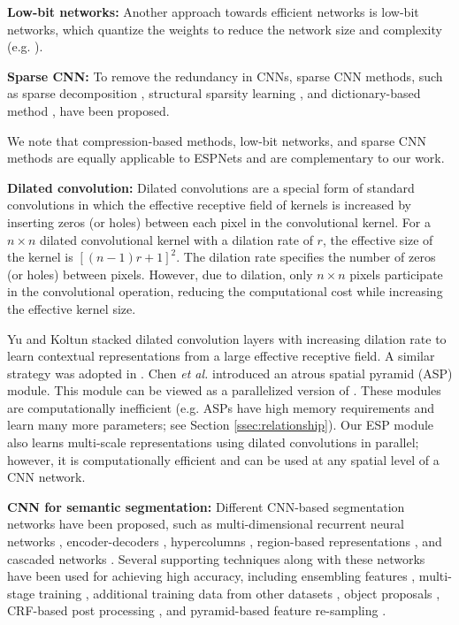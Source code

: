 \documentclass[runningheads]{llncs}
\def\etal{\emph{et al. }}
\begin{document}
\noindent \textbf{Low-bit networks:} Another approach towards efficient networks is low-bit networks, which quantize the weights to reduce the network size and complexity (e.g. \cite{rastegari2016xnor,Hwang2014fixed,courbariaux2016binarized,hubara2016quantized}). 

\noindent \textbf{Sparse CNN:} To remove the redundancy in CNNs, sparse CNN methods, such as sparse decomposition \cite{liu2015sparse}, structural sparsity learning \cite{wen2016learning}, and dictionary-based method \cite{bagherinezhad2017lcnn}, have been proposed. 

We note that compression-based methods, low-bit networks, and sparse CNN methods are equally applicable to ESPNets and are complementary to our work.

\noindent \textbf{Dilated convolution:} Dilated convolutions \cite{holschneider1990real} are a special form of standard convolutions in which the effective receptive field of kernels is increased by inserting zeros (or holes) between each pixel in the convolutional kernel. For a $n \times n$ dilated convolutional kernel with a dilation rate of $r$, the effective size of the kernel is $\left[ (n-1) r + 1\right]^2$. The dilation rate specifies the number of zeros (or holes) between  pixels. However, due to dilation, only $n \times n$ pixels participate in the convolutional operation, reducing the computational cost while increasing the effective kernel size.

Yu and Koltun \cite{yu2015multi} stacked dilated convolution layers with increasing dilation rate to learn contextual representations from a large effective receptive field. A similar strategy was adopted in \cite{yu2017dilated,mehta2017learning,wang2017understanding}. Chen \etal \cite{chen2016deeplab} introduced an atrous spatial pyramid (ASP) module. This module can be viewed as a parallelized version of \cite{chen2016deeplab}. These modules are computationally inefficient (e.g. ASPs have high memory requirements and learn many more parameters; see Section \ref{ssec:relationship}). Our ESP module also learns multi-scale representations using dilated convolutions in parallel; however, it is computationally efficient and can be used at any spatial level of a CNN network. 

\noindent \textbf{CNN for semantic segmentation:} Different CNN-based segmentation networks have been proposed, such as multi-dimensional recurrent neural networks \cite{mrnn:eke}, encoder-decoders \cite{paszke2016enet,romera2018erfnet,badrinarayanan2017segnet,ronneberger2015u}, hypercolumns \cite{hariharan2015hypercolumns}, region-based representations \cite{dai2015convolutional:eke,Caesar2016:eke}, and cascaded networks \cite{lin2017refinenet}. Several supporting techniques along with these networks have been used for achieving high accuracy, including ensembling features \cite{chen2016deeplab}, multi-stage training \cite{long2015fully}, additional training data from other datasets \cite{zhao2017pyramid,chen2016deeplab}, object proposals \cite{Noh2015:eke}, CRF-based post processing \cite{chen2016deeplab}, and pyramid-based feature re-sampling \cite{zhao2017pyramid,he2014spatial,chen2016deeplab}.
\end{document}
